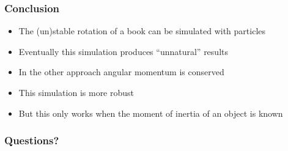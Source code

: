 \documentclass{beamer}
\begin{document}
% 
% 
% 

\begin{frame}
 \frametitle{Conclusion}
 \begin{itemize}
  \item The (un)stable rotation of a book can be simulated with particles
  \item Eventually this simulation produces ``unnatural'' results
  \item In the other approach angular momentum is conserved
  \item This simulation is more robust
  \item But this only works when the moment of inertia of an object is known
 \end{itemize}
\end{frame}

 \begin{frame}
  \frametitle{Questions?}
 \end{frame}
\end{document}
